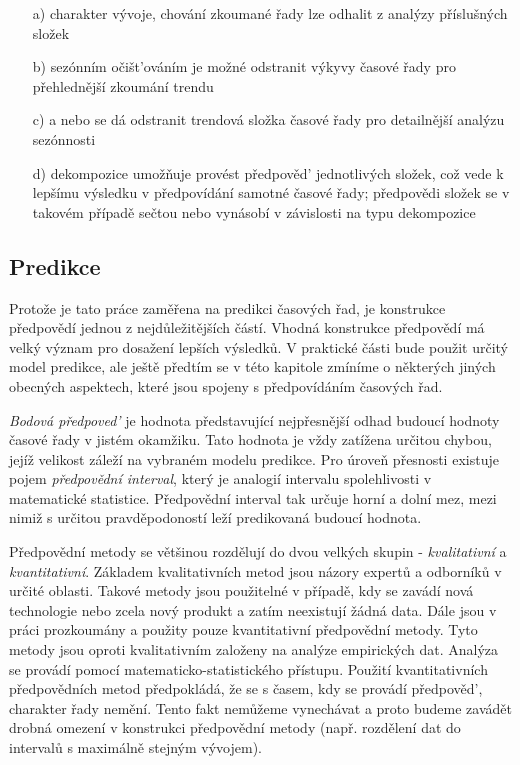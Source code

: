 \documentclass[a4paper,12pt,twoside]{scrreprt}
\begin{document}
\begin{itemize}
\item[a)] charakter vývoje, chování zkoumané řady lze odhalit z analýzy příslušných složek
\item[b)] sezónním očišt'ováním je možné odstranit výkyvy časové řady pro přehlednější zkoumání trendu
\item[c)] a nebo se dá odstranit trendová složka časové řady pro detailnější analýzu sezónnosti
\item[d)] dekompozice umožňuje provést předpověd' jednotlivých složek, což vede k lepšímu výsledku v předpovídání samotné časové řady; předpovědi složek se v takovém případě sečtou nebo vynásobí v závislosti na typu dekompozice
\end{itemize}

\subsection{Predikce}

Protože je tato práce zaměřena na predikci časových řad, je konstrukce předpovědí jednou z nejdůležitějších částí. Vhodná konstrukce předpovědí má velký význam pro dosažení lepších výsledků. V praktické části bude použit určitý model predikce, ale ještě předtím se v této kapitole zmíníme o některých jiných obecných aspektech, které jsou spojeny s předpovídáním časových řad. 

\textit{Bodová předpoved'} je hodnota představující nejpřesnější odhad budoucí hodnoty časové řady v jistém okamžiku. Tato hodnota je vždy zatížena určitou chybou, jejíž velikost záleží na vybraném modelu predikce. Pro úroveň přesnosti existuje pojem \textit{předpovědní interval}, který je analogií intervalu spolehlivosti v matematické statistice. Předpovědní interval tak určuje horní a dolní mez, mezi nimiž s určitou pravděpodoností leží predikovaná budoucí hodnota.  

Předpovědní metody se většinou rozdělují do dvou velkých skupin - \textit{kvalitativní} a \textit{kvantitativní}. Základem kvalitativních metod jsou názory expertů a odborníků v určité oblasti. Takové metody jsou použitelné v případě, kdy se zavádí nová technologie nebo zcela nový produkt a zatím neexistují žádná data. Dále jsou v práci prozkoumány a použity pouze kvantitativní předpovědní metody. Tyto metody jsou oproti kvalitativním založeny na analýze empirických dat. Analýza se provádí pomocí matematicko-statistického přístupu. Použití kvantitativních předpovědních metod předpokládá, že se s časem, kdy se provádí předpověd', charakter řady nemění. Tento fakt nemůžeme vynechávat a proto budeme zavádět drobná omezení v konstrukci předpovědní metody (např. rozdělení dat do intervalů s maximálně stejným vývojem). \cite{cipra}
\end{document}
